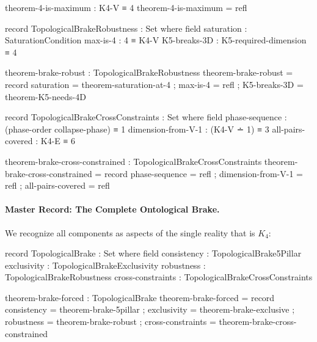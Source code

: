 \documentclass[11pt,a4paper]{book}
\begin{document}
\begin{code}
theorem-4-is-maximum : K4-V ≡ 4
theorem-4-is-maximum = refl

record TopologicalBrakeRobustness : Set where
  field
    saturation    : SaturationCondition
    max-is-4      : 4 ≡ K4-V
    K5-breaks-3D  : K5-required-dimension ≡ 4

theorem-brake-robust : TopologicalBrakeRobustness
theorem-brake-robust = record
  { saturation = theorem-saturation-at-4
  ; max-is-4 = refl
  ; K5-breaks-3D = theorem-K5-needs-4D
  }

record TopologicalBrakeCrossConstraints : Set where
  field
    phase-sequence     : (phase-order collapse-phase) ≡ 1
    dimension-from-V-1 : (K4-V ∸ 1) ≡ 3
    all-pairs-covered  : K4-E ≡ 6

theorem-brake-cross-constrained : TopologicalBrakeCrossConstraints
theorem-brake-cross-constrained = record
  { phase-sequence = refl
  ; dimension-from-V-1 = refl
  ; all-pairs-covered = refl
  }
\end{code}

\paragraph{Master Record: The Complete Ontological Brake.}

We recognize all components as aspects of the single reality that is $K_4$:

\begin{code}
record TopologicalBrake : Set where
  field
    consistency      : TopologicalBrake5Pillar
    exclusivity      : TopologicalBrakeExclusivity
    robustness       : TopologicalBrakeRobustness
    cross-constraints : TopologicalBrakeCrossConstraints

theorem-brake-forced : TopologicalBrake
theorem-brake-forced = record
  { consistency = theorem-brake-5pillar
  ; exclusivity = theorem-brake-exclusive
  ; robustness = theorem-brake-robust
  ; cross-constraints = theorem-brake-cross-constrained
  }
\end{code}
\end{document}
